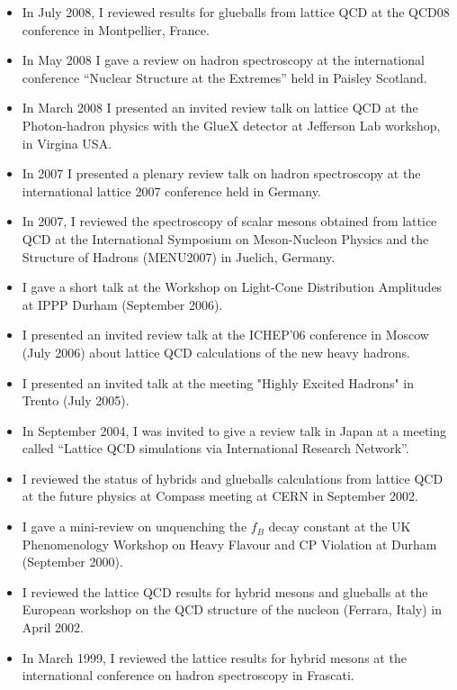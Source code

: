 \documentclass[12pt]{article}
\begin{document}
\begin{itemize}
\item In July 2008, I reviewed results 
      for glueballs from lattice QCD at the QCD08 conference
      in Montpellier, France.

\item In May 2008 I gave a review on
hadron spectroscopy at the international conference 
``Nuclear Structure at the Extremes'' held in Paisley Scotland.

\item In March
2008 I presented an invited review talk on lattice QCD at the
Photon-hadron physics with the GlueX detector at Jefferson Lab
workshop, in Virgina USA. 

\item In 2007 I presented a plenary review talk on hadron spectroscopy 
      at the international lattice 2007 conference held in
      Germany. 

\item  In
2007, I reviewed the spectroscopy of scalar mesons obtained from
lattice QCD at the International Symposium on Meson-Nucleon Physics
and the Structure of Hadrons (MENU2007) in Juelich, Germany.  

\item I gave a short talk at the Workshop on
Light-Cone Distribution Amplitudes at IPPP Durham (September 2006).

\item I presented an invited review talk at the ICHEP'06 conference
in Moscow (July 2006) about lattice QCD calculations of the 
new heavy hadrons.

\item I presented an
     invited talk at the meeting "Highly Excited Hadrons" in Trento (July
      2005). 

\item In September 2004, I was
invited to give a review talk in Japan at a meeting called ``Lattice
QCD simulations via International Research Network''.  

\item I reviewed the status of hybrids
and glueballs calculations from lattice QCD at the future physics at
Compass meeting at CERN in September 2002.  

\item I gave a mini-review on unquenching the $f_B$
decay constant at the UK Phenomenology Workshop on Heavy Flavour and
CP Violation at Durham (September 2000). 

\item I
reviewed the lattice QCD results for hybrid mesons and glueballs at
the European workshop on the QCD structure of the nucleon (Ferrara,
Italy) in April 2002.  

\item In March 1999, I reviewed the lattice results for hybrid mesons at the
international conference on hadron spectroscopy in Frascati.  

\end{itemize}
\end{document}

